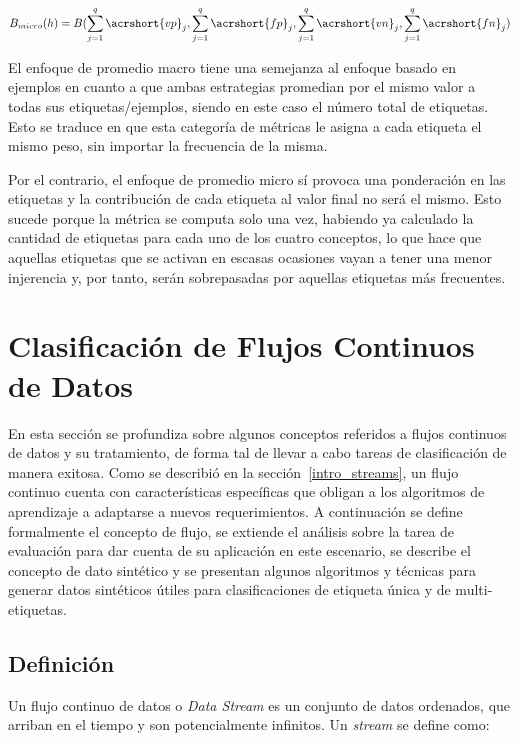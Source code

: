 \begin{equation}
	B_{micro}(h) = B( \sum_{j=1}^{q} \acrshort{vp}_{j}, \sum_{j=1}^{q}
	\acrshort{fp}_{j},\sum_{j=1}^{q}  \acrshort{vn}_{j},\sum_{j=1}^{q}
	\acrshort{fn}_{j})
\end{equation}

El enfoque de promedio macro tiene una semejanza al enfoque basado en ejemplos
en cuanto a que ambas estrategias promedian por el mismo valor a todas sus
etiquetas/ejemplos, siendo en este caso el número total de etiquetas. Esto se
traduce en que esta categoría de métricas le asigna a cada etiqueta el mismo
peso, sin importar la frecuencia de la misma.

Por el contrario, el enfoque de promedio micro sí provoca una ponderación en las
etiquetas y la contribución de cada etiqueta al valor final no será el mismo.
Esto sucede porque la métrica se computa solo una vez, habiendo ya calculado la
cantidad de etiquetas para cada uno de los cuatro conceptos, lo que hace que
aquellas etiquetas que se activan en escasas ocasiones vayan a tener una menor
injerencia y, por tanto, serán sobrepasadas por aquellas etiquetas más frecuentes.

\section{Clasificación de Flujos Continuos de Datos}

En esta sección se profundiza sobre algunos conceptos referidos a flujos
continuos de datos y su tratamiento, de forma tal de llevar a cabo tareas de
clasificación de manera exitosa.  Como se describió en la
sección~\ref{intro_streams}, un flujo continuo cuenta con características
específicas que obligan a los algoritmos de aprendizaje a adaptarse a nuevos
requerimientos.  A continuación se define formalmente el concepto de flujo, se
extiende el análisis sobre la tarea de evaluación para dar cuenta de su
aplicación en este escenario, se describe el concepto de dato sintético y se
presentan algunos algoritmos y técnicas para generar datos sintéticos útiles
para clasificaciones de etiqueta única y de multi-etiquetas.

\subsection{Definición}

Un flujo continuo de datos o \textit{Data Stream} es un conjunto de datos
ordenados, que arriban en el tiempo y son potencialmente infinitos. Un
\textit{stream} se define como:

